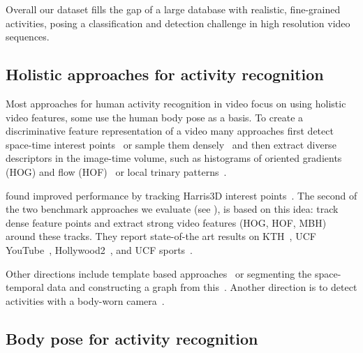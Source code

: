 Overall our dataset fills the gap of a large database with realistic, fine-grained activities, posing a classification and detection challenge in high resolution video sequences.

\subsection{Holistic approaches for activity recognition}
Most approaches for human activity recognition in video focus on using holistic video features, some use the human body pose as a basis.
%
To create a discriminative feature representation of a video many approaches first detect space-time interest points~\citep{chakraborty11iccv,laptev05ijcv} or sample them densely~\citep{wang09bmvc} and then extract diverse descriptors in the image-time volume, such as histograms of oriented gradients (HOG) and flow (HOF)~\citep{laptev08cvpr} or local trinary patterns~\citep{yeffet09iccv}.

\citet{messing09iccv} found improved performance by tracking Harris3D interest points~\citep{laptev05ijcv}. The second of the two benchmark approaches we evaluate (see ), is based on this idea: \citet{wang11cvpr,wang13ijcv} track dense feature points and extract strong video features (HOG, HOF, MBH) around these tracks. They report state-of-the art results on KTH~\citep{schuldt04icpr}, UCF YouTube~\citep{liu09cvpr}, Hollywood2~\citep{marszalek09cvpr}, and UCF sports~\citep{rodriguez08cvpr}.

Other directions include template based approaches~\citep{rodriguez08cvpr} or segmenting the space-temporal data and constructing a graph from this~\citep{brendel11iccv}. Another direction is to detect activities with a body-worn camera~\citep{taralova09ev}.
 
 
\subsection{Body pose for activity recognition}

